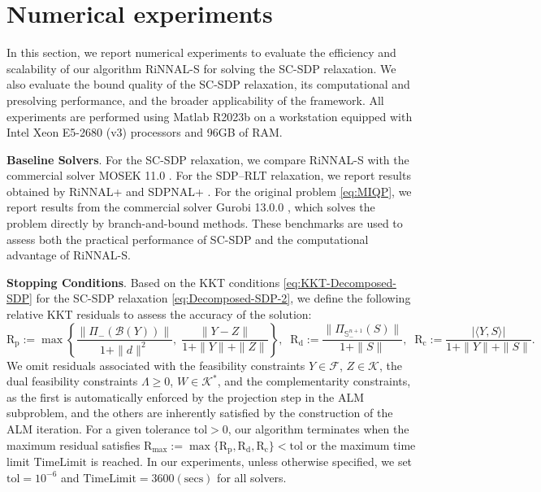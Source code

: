 \documentclass[11pt]{article}
\def\B{\mathcal{B}}
\def\K{\mathcal{K}}
\def\F{\mathcal{F}}
\def\S{\mathbb{S}}
\def\tol{\mathrm{tol}}
\def\timelimit{\mathrm{TimeLimit}}
\theoremstyle{plain}
\begin{document}
\section{Numerical experiments}\label{sec:numerical}
In this section, we report numerical experiments to evaluate the efficiency and scalability of our algorithm RiNNAL-S for solving the SC-SDP relaxation. We also evaluate
the bound quality of the SC-SDP relaxation, its computational and presolving performance, and the broader applicability of the framework.
All experiments are performed using {\sc Matlab} R2023b
on a workstation equipped with Intel Xeon E5-2680 (v3) processors
and 96GB of RAM.

\medskip
\noindent\textbf{Baseline Solvers}. For the SC-SDP relaxation, we compare RiNNAL-S with the commercial solver MOSEK 11.0 \cite{mosek}. For the SDP--RLT relaxation, we report results obtained by RiNNAL+ \cite{RiNNALplus} and SDPNAL+ \cite{SDPNALp1,SDPNALp2}. For the original problem \eqref{eq:MIQP}, we report results from the commercial solver Gurobi 13.0.0 \cite{gurobi}, which solves the problem directly by branch-and-bound methods. These benchmarks are used to assess both the practical performance of SC-SDP and the computational advantage of RiNNAL-S.

\medskip
\noindent\textbf{Stopping Conditions}. Based on the KKT conditions \eqref{eq:KKT-Decomposed-SDP} for the SC-SDP relaxation \eqref{eq:Decomposed-SDP-2}, we define the following relative KKT residuals to assess the accuracy of the solution:
\begin{equation*}
\operatorname{R_p}:=
\max\left\{
\frac{{ \|\Pi_{-}(\B(Y))\|}}{1+\|d\|^2},\;
\frac{\|Y-Z\|}{1+\|Y\|+\|Z\|}
\right\},
\;\;
\operatorname{R_d} :=  
\frac{\|\Pi_{\S_-^{n+1}}(S)\|}{1+\|S\|},
\;\;
\operatorname{R_{c}} := 
\frac{|\langle Y, S\rangle|}{1+\|Y\|+\|S\|}.
\end{equation*}
\noindent
We omit residuals associated with the feasibility constraints
$Y\in \F$, $Z\in \K$, the dual feasibility constraints $\Lambda\geq 0$, $W\in \K^*$, and the complementarity constraints,
as the first is automatically enforced by the projection step in the ALM subproblem, and the others are inherently satisfied by the construction of the ALM iteration.
For a given tolerance $\tol> 0$, our algorithm terminates when the maximum residual satisfies $\operatorname{R_{max}}:=\max\{\operatorname{R_p},\operatorname{R_d},\operatorname{R_c}\}<\tol$ or the maximum time limit $\timelimit$ is reached. In our experiments, unless otherwise specified, we set $\tol = 10^{-6}$ and $\timelimit = 3600\mathrm{(secs)}$ for all solvers.
\end{document}
